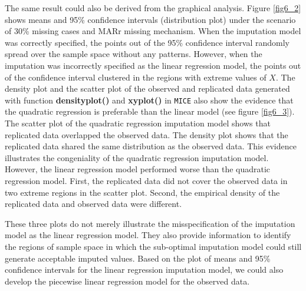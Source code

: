 	The same result could also be derived from the graphical analysis. Figure \ref{fig6_2} shows means and 95\% confidence intervals (distribution plot) under the scenario of 30\% missing cases and MARr missing mechanism. When the imputation model was correctly specified, the points out of the 95\% confidence interval randomly spread over the sample space without any patterns. However, when the imputation was incorrectly specified as the linear regression model, the points out of the confidence interval clustered in the regions with extreme values of $X$. The density plot and the scatter plot of the observed and replicated data generated with function \textbf{densityplot()} and \textbf{xyplot()} in \texttt{MICE} also show the evidence that the quadratic regression is preferable than the linear model (see figure \ref{fig6_3}). The scatter plot of the quadratic regression imputation model shows that replicated data overlapped the observed data. The density plot shows that the replicated data shared the same distribution as the observed data. This evidence illustrates the congeniality of the quadratic regression imputation model. However, the linear regression model performed worse than the quadratic regression model. First, the replicated data did not cover the observed data in two extreme regions in the scatter plot. Second, the empirical density of the replicated data and observed data were different. 
	
	These three plots do not merely illustrate the misspecification of the imputation model as the linear regression model. They also provide information to identify the regions of sample space in which the sub-optimal imputation model could still generate acceptable imputed values. Based on the plot of means and 95\% confidence intervals for the linear regression imputation model, we could also develop the piecewise linear regression model for the observed data. 
	
